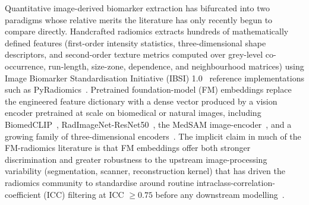 
Quantitative image-derived biomarker extraction has bifurcated into two paradigms whose relative merits the literature has only recently begun to compare directly. Handcrafted radiomics extracts hundreds of mathematically defined features (first-order intensity statistics, three-dimensional shape descriptors, and second-order texture metrics computed over grey-level co-occurrence, run-length, size-zone, dependence, and neighbourhood matrices) using Image Biomarker Standardisation Initiative (IBSI) 1.0~\cite{zwanenburg2020} reference implementations such as PyRadiomics~\cite{vangriethuysen2017}. Pretrained foundation-model (FM) embeddings replace the engineered feature dictionary with a dense vector produced by a vision encoder pretrained at scale on biomedical or natural images, including BiomedCLIP~\cite{zhang2024biomedclip}, RadImageNet-ResNet50~\cite{mei2022radimagenet}, the MedSAM image-encoder~\cite{ma2024medsam}, and a growing family of three-dimensional encoders~\cite{pai2024}. The implicit claim in much of the FM-radiomics literature is that FM embeddings offer both stronger discrimination and greater robustness to the upstream image-processing variability (segmentation, scanner, reconstruction kernel) that has driven the radiomics community to standardise around routine intraclass-correlation-coefficient (ICC) filtering at ICC $\geq 0.75$ before any downstream modelling~\cite{pavic2018,vantimmeren2020}.


